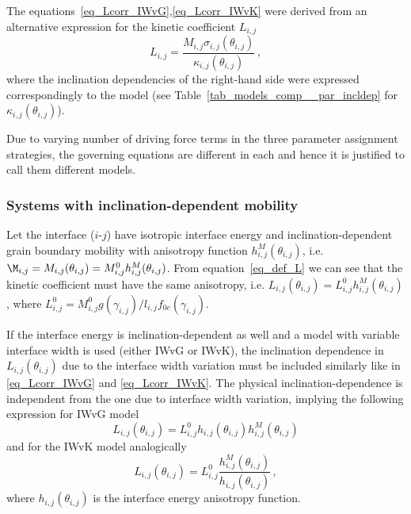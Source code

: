 		The equations~\eqref{eq_Lcorr_IWvG},\eqref{eq_Lcorr_IWvK} were derived from an alternative expression for the kinetic coefficient $L_{i,j}$
		\begin{equation}
			L_{i,j} = \frac{M_{i,j}\sigma_{i,j}(\theta_{i,j})}{\kappa_{i,j}(\theta_{i,j})} \,,
		\end{equation}
		where the inclination dependencies of the right-hand side were expressed correspondingly to the model (see Table~\ref{tab_models_comp__par_incldep} for $\kappa_{i,j}(\theta_{i,j})$).
		
		Due to varying number of driving force terms in the three parameter assignment strategies, the governing equations are different in each and hence it is justified to call them different models.

		\subsubsection{Systems with inclination-dependent mobility}
		Let the interface ($i$-$j$) have isotropic interface energy and inclination-dependent grain boundary mobility with anisotropy function $h_{i,j}^M(\theta_{i,j})$, i.e. $\M_{i,j}=M_{i,j}(\theta_{i,j})=M_{i,j}^0h_{i,j}^M(\theta_{i,j})$. From equation~\eqref{eq_def_L} we can see that the kinetic coefficient must have the same anisotropy, i.e. $L_{i,j}(\theta_{i,j})=L_{i,j}^0h_{i,j}^M(\theta_{i,j})$, where $L_{i,j}^0=M_{i,j}^0g(\gamma_{i,j})/l_{i,j}f_{0c}(\gamma_{i,j})$. 
		
		If the interface energy is inclination-dependent as well and a model with variable interface width is used (either IWvG or IWvK), the inclination dependence in $L_{i,j}(\theta_{i,j})$ due to the interface width variation must be included similarly like in \eqref{eq_Lcorr_IWvG} and \eqref{eq_Lcorr_IWvK}. The physical inclination-dependence is independent from the one due to interface width variation, implying the following expression for IWvG model
		\begin{equation}     
			L_{i,j}(\theta_{i,j}) = L_{i,j}^0h_{i,j}(\theta_{i,j})h_{i,j}^M(\theta_{i,j})
		\end{equation}
		and for the IWvK model analogically
		\begin{equation}
			L_{i,j}(\theta_{i,j}) = L_{i,j}^0\frac{h_{i,j}^M(\theta_{i,j})}{h_{i,j}(\theta_{i,j})} \,,
		\end{equation}
		where $h_{i,j}(\theta_{i,j})$ is the interface energy anisotropy function.

